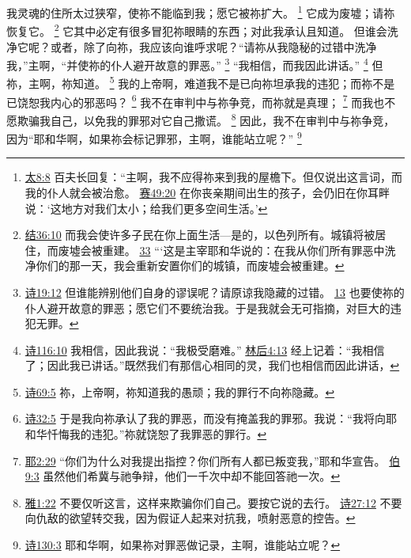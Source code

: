 \documentclass[12pt, a4paper, oneside]{ctexart}
\newcounter{parnum}[section]
\newcommand{\N}{%
   \noindent\refstepcounter{parnum}%
    \makebox[\parindent][l]{\textbf{\arabic{parnum}.}}}
\begin{document}
\N 我灵魂的住所太过狭窄，使祢不能临到我；愿它被祢扩大。
    \footnote {
        \href{https://biblehub.com/matthew/8-8.htm}{太8:8} 百夫长回复：“主啊，我不应得祢来到我的屋檐下。但仅说出这言词，而我的仆人就会被治愈。
        \href{https://biblehub.com/isaiah/49-20.htm}{赛49:20} 在你丧亲期间出生的孩子，会仍旧在你耳畔说：‘这地方对我们太小；给我们更多空间生活。’
	}
	它成为废墟；请祢恢复它。
    \footnote {
        \href{https://biblehub.com/ezekiel/36-10.htm}{结36:10} 而我会使许多子民在你上面生活---是的，以色列所有。城镇将被居住，而废墟会被重建。
        \href{https://biblehub.com/ezekiel/36-33.htm}{33} “‘这是主宰耶和华说的：在我从你们所有罪恶中洗净你们的那一天，我会重新安置你们的城镇，而废墟会被重建。
	}
	它其中必定有很多冒犯祢眼睛的东西；对此我承认且知道。
	但谁会洗净它呢？或者，除了向祢，我应该向谁呼求呢？“请祢从我隐秘的过错中洗净我，”主啊，“并使祢的仆人避开故意的罪恶。”
    \footnote {
        \href{https://biblehub.com/psalms/19-12.htm}{诗19:12} 但谁能辨别他们自身的谬误呢？请原谅我隐藏的过错。
        \href{https://biblehub.com/psalms/19-13.htm}{13} 也要使祢的仆人避开故意的罪恶；愿它们不要统治我。于是我就会无可指摘，对巨大的违犯无罪。
	}
	“我相信，而我因此讲话。”
    \footnote {
        \href{https://biblehub.com/psalms/116-10.htm}{诗116:10} 我相信，因此我说：“我极受磨难。”
        \href{https://biblehub.com/2_corinthians/4-13.htm}{林后4:13} 经上记着：“我相信了；因此我已讲话。”既然我们有那信心相同的灵，我们也相信而因此讲话，
	}
	但祢，主啊，祢知道。
    \footnote {
        \href{https://biblehub.com/psalms/69-5.htm}{诗69:5} 祢，上帝啊，祢知道我的愚顽；我的罪行不向祢隐藏。
	}
	我的上帝啊，难道我不是已向祢坦承我的违犯；而祢不是已饶恕我内心的邪恶吗？
    \footnote {
        \href{https://biblehub.com/psalms/32-5.htm}{诗32:5} 于是我向祢承认了我的罪恶，而没有掩盖我的罪邪。我说：“我将向耶和华忏悔我的违犯。”祢就饶恕了我罪恶的罪行。
	}
	我不在审判中与祢争竞，而祢就是真理；
    \footnote {
        \href{https://biblehub.com/jeremiah/2-29.htm}{耶2:29} “你们为什么对我提出指控？你们所有人都已叛变我，”耶和华宣告。
        \href{https://biblehub.com/job/9-3.htm}{伯9:3} 虽然他们希冀与祂争辩，他们一千次中却不能回答祂一次。
	}
    而我也不愿欺骗我自己，以免我的罪邪对它自己撒谎。
    \footnote {
        \href{https://biblehub.com/james/1-22.htm}{雅1:22} 不要仅听这言，这样来欺骗你们自己。要按它说的去行。
        \href{https://biblehub.com/psalms/27-12.htm}{诗27:12} 不要向仇敌的欲望转交我，因为假证人起来对抗我，喷射恶意的控告。
	}
	因此，我不在审判中与祢争竞，因为“耶和华啊，如果祢会标记罪邪，主啊，谁能站立呢？”
    \footnote {
        \href{https://biblehub.com/psalms/130-3.htm}{诗130:3} 耶和华啊，如果祢对罪恶做记录，主啊，谁能站立呢？
	}
\end{document}
